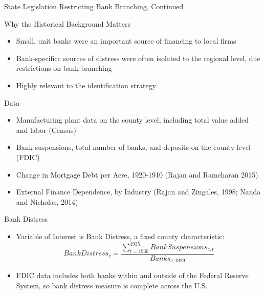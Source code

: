 \documentclass[11pt]{beamer}
\begin{document}
\begin{frame}{State Legislation Restricting Bank Branching, Continued}
\begin{figure}
\end{figure}
\end{frame}

\begin{frame}{Why the Historical Background Matters}
\begin{itemize}
\item Small, unit banks were an important source of financing to local firms
\item Bank-specificc sources of distress were often isolated to the regional level, due restrictions on bank branching
\item Highly relevant to the identification strategy
\end{itemize}
\end{frame}

\begin{frame}{Data}
\begin{itemize}
\item Manufacturing plant data on the county level, including total value added and labor (Census)
\item Bank suspensions, total number of banks, and deposits on the county level (FDIC)
\item Change in Mortgage Debt per Acre, 1920-1910 (Rajan and Ramcharan 2015)
\item External Finance Dependence, by Industry (Rajan and Zingales, 1998; Nanda and Nicholas, 2014)
\end{itemize}
\end{frame}

\begin{frame}{Bank Distress}
\begin{itemize}
\item Variable of Interest is Bank Distress, a fixed county characteristic:
\[
BankDistress_c = \frac{\sum_{t=1930}^{1935} BankSuspensions_{c, t}} {Banks_{c, 1929}}
\]
\item FDIC data includes both banks within and outside of the Federal Reserve System, so bank distress measure is complete across the U.S.
\end{itemize}
\end{frame}
\end{document}
